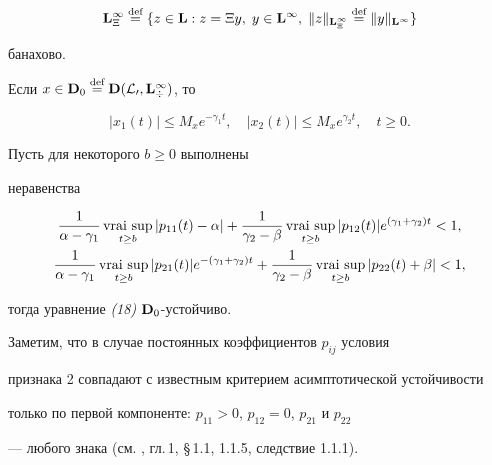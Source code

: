 $$


\spc L^\infty_\Xi\eqdef\{z\in\spc L:z=\Xi y,\; y\in\spc L^\infty,\;


\|z\|_{\bold L^\infty_\Xi}\eqdef\|y\|_{\bold L^\infty}\}


$$


банахово.


Если $x\in\bold D_0\overset{\text{def}}{=}\bold D(\cal L_0,\bold L^\infty_\Xi)$, то


$$


|x_1(t)|\le M_xe^{-\gamma_1t},\quad


|x_2(t)|\le M_xe^{\gamma_2t},\quad t\ge 0.


$$





\begin{priz} Пусть для некоторого $b\ge 0$ выполнены


неравенства


\begin{gather*}


\frac{1}{\alpha - \gamma_1}\vraisup_{t\ge b}|p_{11}(t) - \alpha| +


\frac{1}{\gamma_2 - \beta}\vraisup_{t\ge b}|p_{12}(t)|


e^{(\gamma_1+\gamma_2)t} < 1,\\


\frac{1}{\alpha-\gamma_1}\vraisup_{t\ge b}|p_{21}(t)|


e^{-(\gamma_1+\gamma_2)t} +


\frac{1}{\gamma_2 - \beta}\vraisup_{t\ge b}|p_{22}(t) + \beta| < 1,


\end{gather*}


тогда уравнение {\em (18)} $\bold D_0$-устойчиво.


\end{priz}





Заметим, что в случае постоянных коэффициентов $p_{ij}$ условия


признака 2 совпадают с известным критерием асимптотической устойчивости


только по первой компоненте: $p_{11}> 0$, $p_{12} = 0$, $p_{21}$ и $p_{22} $


--- любого знака (см. \cite{Vor}, гл.\,1, \S\,1.1, 1.1.5, следствие 1.1.1).





